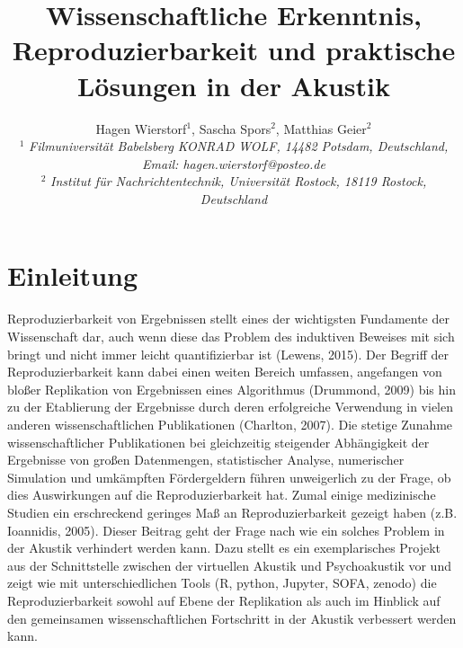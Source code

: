 \documentclass[a4paper, 10pt, twocolumn]{article}
\begin{document}
\date{}                                         %

\title{\vspace{-8mm}Wissenschaftliche Erkenntnis, Reproduzierbarkeit und
praktische Lösungen in der Akustik}

\author{
Hagen Wierstorf$^1$, Sascha Spors$^2$, Matthias Geier$^2$\\
$^1$ \emph{\small Filmuniversität Babelsberg KONRAD WOLF, 14482 Potsdam,
Deutschland, Email: hagen.wierstorf@posteo.de
}\\
$^2$ \emph{\small Institut für Nachrichtentechnik, Universität Rostock, 18119 Rostock, Deutschland
}\\
} \maketitle
\thispagestyle{empty}           %
\section*{Einleitung}
\label{sec:Einleitung}

Reproduzierbarkeit von Ergebnissen stellt eines der wichtigsten Fundamente der
Wissenschaft dar, auch wenn diese das Problem des induktiven Beweises mit sich
bringt und nicht immer leicht quantifizierbar ist (Lewens, 2015). Der Begriff
der Reproduzierbarkeit kann dabei einen weiten Bereich umfassen, angefangen von
bloßer Replikation von Ergebnissen eines Algorithmus (Drummond, 2009) bis hin zu
der Etablierung der Ergebnisse durch deren erfolgreiche Verwendung in vielen
anderen wissenschaftlichen Publikationen (Charlton, 2007). Die stetige Zunahme
wissenschaftlicher Publikationen bei gleichzeitig steigender Abhängigkeit der
Ergebnisse von großen Datenmengen, statistischer Analyse, numerischer Simulation
und umkämpften Fördergeldern führen unweigerlich zu der Frage, ob dies
Auswirkungen auf die Reproduzierbarkeit hat. Zumal einige medizinische Studien
ein erschreckend geringes Maß an Reproduzierbarkeit gezeigt haben (z.B.
Ioannidis, 2005). Dieser Beitrag geht der Frage nach wie ein solches Problem in
der Akustik verhindert werden kann. Dazu stellt es ein exemplarisches Projekt
aus der Schnittstelle zwischen der virtuellen Akustik und Psychoakustik vor und
zeigt wie mit unterschiedlichen Tools (R, python, Jupyter, SOFA, zenodo) die
Reproduzierbarkeit sowohl auf Ebene der Replikation als auch im Hinblick auf den
gemeinsamen wissenschaftlichen Fortschritt in der Akustik verbessert werden
kann.
\end{document}
